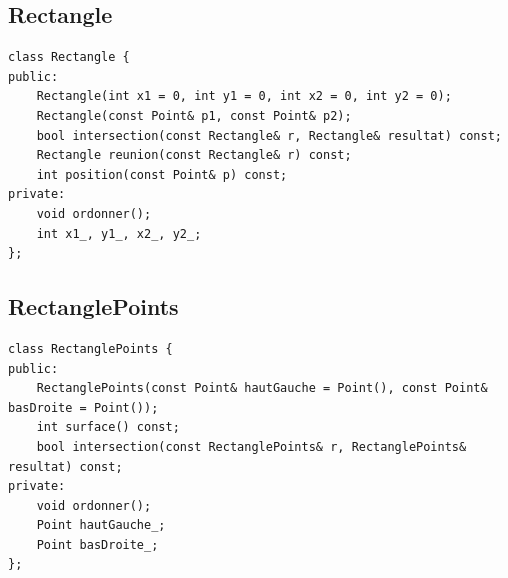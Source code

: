 \documentclass[12pt,a4paper]{article}
\begin{document}
\subsection*{Rectangle}
\begin{lstlisting}[style=cppstyle]
class Rectangle {
public:
    Rectangle(int x1 = 0, int y1 = 0, int x2 = 0, int y2 = 0);
    Rectangle(const Point& p1, const Point& p2);
    bool intersection(const Rectangle& r, Rectangle& resultat) const;
    Rectangle reunion(const Rectangle& r) const;
    int position(const Point& p) const;
private:
    void ordonner();
    int x1_, y1_, x2_, y2_;
};
\end{lstlisting}

\subsection*{RectanglePoints}
\begin{lstlisting}[style=cppstyle]
class RectanglePoints {
public:
    RectanglePoints(const Point& hautGauche = Point(), const Point& basDroite = Point());
    int surface() const;
    bool intersection(const RectanglePoints& r, RectanglePoints& resultat) const;
private:
    void ordonner();
    Point hautGauche_;
    Point basDroite_;
};
\end{lstlisting}
\end{document}
